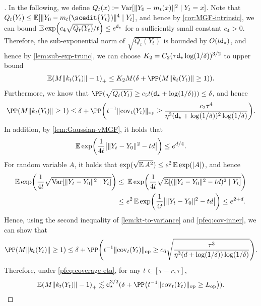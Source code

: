 \begin{proof}[]
In the following, we define $Q_t(x)\coloneqq \mathrm{Var}[ \lVert Y_0-m_t(x)\rVert^2 \mid Y_t=x ]$. Note that $Q_t(Y_t)\leq \En[ \nrm{Y_0-m_t(\scedit{Y_t})}^4 \mid Y_t ]$, and hence by \cref{cor:MGF-intrinsic}, we can bound $\En \exp\prn*{ c_4\sqrt{Q_t(Y_t)}/t }\leq e^{\dstar}$ for a sufficiently small constant $c_4>0$.
Therefore, the sub-exponential norm of $\sqrt{Q_t(Y_t)}$ is bounded by $O(t\mathsf{d}_\star)$, and hence 
by \cref{lem:sub-exp-trunc}, we can choose $K_2=C_2(\tau\mathsf{d}_\star\log(1/\delta))^{3/2}$ to  upper bound 
\begin{align*}
    \En\prn*{M \nrm{k_t(Y_t)}-1 }_+
    \leq K_2M(\delta+\PP\prn*{M \nrm{k_t(Y_t)}\geq 1}).
\end{align*}
Furthermore, we know that $\PP(\sqrt{Q_t(Y_t)}\geq c_5t(\dstar+\log(1/\delta)))\leq \delta$, and hence
\begin{align*}
    \PP\prn*{M \nrm{k_t(Y_t)}\geq 1}
    \leq \delta+\PP\prn*{ t^{-1}\nrmop{\cov_t(Y_t)}\geq \frac{c_2\tau^4}{\eta^3(\dstar+\log(1/\delta))^2\log(1/\delta)} }.
\end{align*}
In addition, by \cref{lem:Gaussian-vMGF}, it holds that
\begin{align*}
    \En\exp\prn*{ \frac{1}{4t}\abs*{\nrm{Y_t-Y_0}^2-td} }\leq e^{d/4}.
\end{align*}
For random variable $A$, it holds that $\exp(\sqrt{\operatorname{\mathbb{E}} A^2})\leq e^2\operatorname{\mathbb{E}} \exp(\lvert A\rvert)$, and hence
\begin{align*}
    \En\exp\prn*{ \frac{1}{4t}\sqrt{\Var[ \nrm{Y_t-Y_0}^2 \mid Y_t]} }
    \leq&~ \En\exp\prn*{ \frac{1}{4t}\sqrt{\En[\prn{\nrm{Y_t-Y_0}^2-td}^2\mid Y_t]} } \\
    \leq&~ e^2\En\exp\prn*{ \frac{1}{4t}\abs*{\nrm{Y_t-Y_0}^2-td} }\leq e^{2+d}.
\end{align*}
Hence, using the second inequality of \cref{lem:kt-to-variance} and \cref{pfeq:cov-inner}, we can show that
\begin{align*}
    \PP\prn*{M \nrm{k_t(Y_t)}\geq 1}
    \leq \delta+\PP\prn*{ t^{-1}\nrmop{\cov_t(Y_t)}\geq c_6\sqrt{\frac{\tau^3}{\eta^3(d+\log(1/\delta))\log(1/\delta)}} }.
\end{align*}
Therefore, under \cref{pfeq:coverage-eta}, for any $t\in[\tau-r,\tau]$,
\begin{align*}
    \En\prn*{M \nrm{k_t(Y_t)}-1 }_+\leqsim \dstar^{3/2}(\delta+\PP\prn*{ t^{-1}\nrmop{\cov_t(Y_t)}\geq \Lop}).
\end{align*}
\end{proof}


